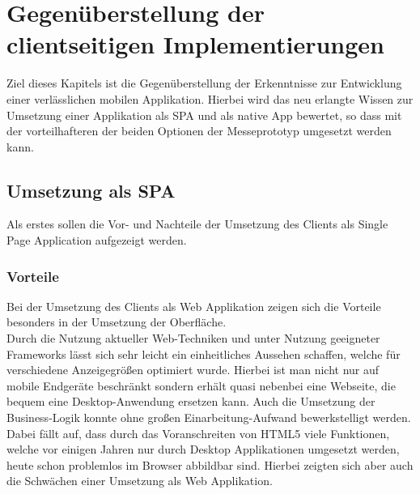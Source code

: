 \chapter{Gegenüberstellung der clientseitigen Implementierungen}
\label{cha:gegenueberstellung}
Ziel dieses Kapitels ist die Gegenüberstellung der Erkenntnisse zur Entwicklung einer verlässlichen mobilen Applikation. Hierbei wird das neu erlangte Wissen zur Umsetzung einer Applikation als SPA und als native App bewertet, so dass mit der vorteilhafteren der beiden Optionen der Messeprototyp umgesetzt werden kann.

\section{Umsetzung als SPA}
\label{sec:gegenueberstellung-SPA}
Als erstes sollen die Vor- und Nachteile der Umsetzung des Clients als Single Page Application aufgezeigt werden.

\subsection{Vorteile}
\label{sec:vorteile-SPA}
Bei der Umsetzung des Clients als Web Applikation zeigen sich die Vorteile besonders in der Umsetzung der Oberfläche. \\
Durch die Nutzung aktueller Web-Techniken und unter Nutzung geeigneter Frameworks lässt sich sehr leicht ein einheitliches Aussehen schaffen, welche für verschiedene Anzeigegrößen optimiert wurde. Hierbei ist man nicht nur auf mobile Endgeräte beschränkt sondern erhält quasi nebenbei eine Webseite, die bequem eine Desktop-Anwendung ersetzen kann. Auch die Umsetzung der Business-Logik konnte ohne großen Einarbeitung-Aufwand bewerkstelligt werden. Dabei fällt auf, dass durch das Voranschreiten von HTML5 viele Funktionen, welche vor einigen Jahren nur durch Desktop Applikationen umgesetzt werden, heute schon problemlos im Browser abbildbar sind. Hierbei zeigten sich aber auch die Schwächen einer Umsetzung als Web Applikation. 

